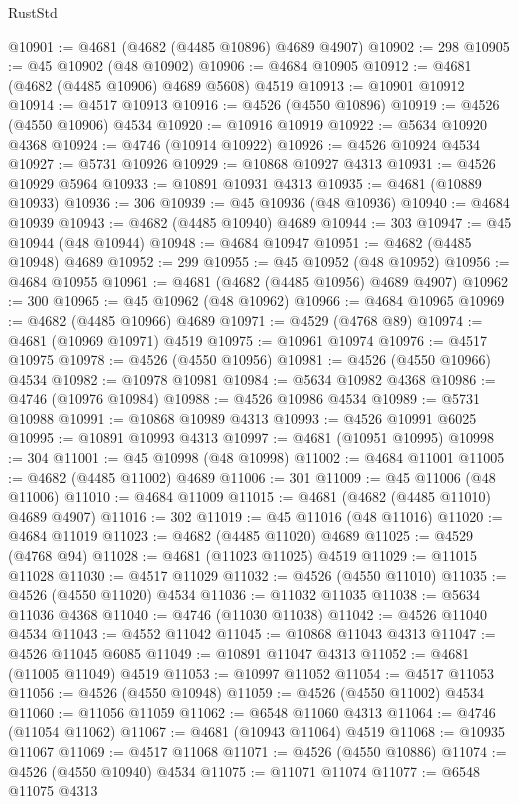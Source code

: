 \begin{lexlean}{RustStd}
\begin{coremodule}
@10901 := @4681 (@4682 (@4485 @10896) @4689 @4907)
@10902 := 298
@10905 := @45 @10902 (@48 @10902)
@10906 := @4684 @10905
@10912 := @4681 (@4682 (@4485 @10906) @4689 @5608) @4519
@10913 := @10901 @10912
@10914 := @4517 @10913
@10916 := @4526 (@4550 @10896)
@10919 := @4526 (@4550 @10906) @4534
@10920 := @10916 @10919
@10922 := @5634 @10920 @4368
@10924 := @4746 (@10914 @10922)
@10926 := @4526 @10924 @4534
@10927 := @5731 @10926
@10929 := @10868 @10927 @4313
@10931 := @4526 @10929 @5964
@10933 := @10891 @10931 @4313
@10935 := @4681 (@10889 @10933)
@10936 := 306
@10939 := @45 @10936 (@48 @10936)
@10940 := @4684 @10939
@10943 := @4682 (@4485 @10940) @4689
@10944 := 303
@10947 := @45 @10944 (@48 @10944)
@10948 := @4684 @10947
@10951 := @4682 (@4485 @10948) @4689
@10952 := 299
@10955 := @45 @10952 (@48 @10952)
@10956 := @4684 @10955
@10961 := @4681 (@4682 (@4485 @10956) @4689 @4907)
@10962 := 300
@10965 := @45 @10962 (@48 @10962)
@10966 := @4684 @10965
@10969 := @4682 (@4485 @10966) @4689
@10971 := @4529 (@4768 @89)
@10974 := @4681 (@10969 @10971) @4519
@10975 := @10961 @10974
@10976 := @4517 @10975
@10978 := @4526 (@4550 @10956)
@10981 := @4526 (@4550 @10966) @4534
@10982 := @10978 @10981
@10984 := @5634 @10982 @4368
@10986 := @4746 (@10976 @10984)
@10988 := @4526 @10986 @4534
@10989 := @5731 @10988
@10991 := @10868 @10989 @4313
@10993 := @4526 @10991 @6025
@10995 := @10891 @10993 @4313
@10997 := @4681 (@10951 @10995)
@10998 := 304
@11001 := @45 @10998 (@48 @10998)
@11002 := @4684 @11001
@11005 := @4682 (@4485 @11002) @4689
@11006 := 301
@11009 := @45 @11006 (@48 @11006)
@11010 := @4684 @11009
@11015 := @4681 (@4682 (@4485 @11010) @4689 @4907)
@11016 := 302
@11019 := @45 @11016 (@48 @11016)
@11020 := @4684 @11019
@11023 := @4682 (@4485 @11020) @4689
@11025 := @4529 (@4768 @94)
@11028 := @4681 (@11023 @11025) @4519
@11029 := @11015 @11028
@11030 := @4517 @11029
@11032 := @4526 (@4550 @11010)
@11035 := @4526 (@4550 @11020) @4534
@11036 := @11032 @11035
@11038 := @5634 @11036 @4368
@11040 := @4746 (@11030 @11038)
@11042 := @4526 @11040 @4534
@11043 := @4552 @11042
@11045 := @10868 @11043 @4313
@11047 := @4526 @11045 @6085
@11049 := @10891 @11047 @4313
@11052 := @4681 (@11005 @11049) @4519
@11053 := @10997 @11052
@11054 := @4517 @11053
@11056 := @4526 (@4550 @10948)
@11059 := @4526 (@4550 @11002) @4534
@11060 := @11056 @11059
@11062 := @6548 @11060 @4313
@11064 := @4746 (@11054 @11062)
@11067 := @4681 (@10943 @11064) @4519
@11068 := @10935 @11067
@11069 := @4517 @11068
@11071 := @4526 (@4550 @10886)
@11074 := @4526 (@4550 @10940) @4534
@11075 := @11071 @11074
@11077 := @6548 @11075 @4313

\end{coremodule}
\end{lexlean}
